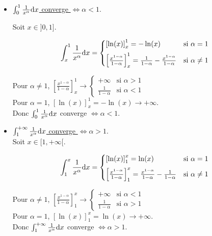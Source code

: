 \documentclass[]{article}
\begin{document}
\begin{itemize}
    \item \underline{$\int_{0}^{1} \frac{1}{x^{\alpha}} \text{d}x$ converge $\iff \alpha < 1$}.
    
    Soit $x \in ]0, 1]$. 

    \[ \int_{x}^{1} \frac{1}{x^{\alpha}} \text{d}x = \begin{cases}
        \left[ \ln(x) \right]_{x}^{1} = -\ln(x) & \text{si } \alpha = 1 \\[0.5em]
        \left[ \frac{x^{1-\alpha}}{1-\alpha} \right]_{x}^{1} = \frac{1}{1-\alpha} - \frac{x^{1-\alpha}}{1-\alpha} & \text{si } \alpha \neq 1
    \end{cases} \]

    Pour $\alpha \neq 1$, $\left[ \frac{x^{1-\alpha}}{1-\alpha} \right]_{x}^{1} \longrightarrow \begin{cases}
        +\infty & \text{si } \alpha > 1 \\[0.5em]
        \frac{1}{1-\alpha} & \text{si } \alpha < 1
    \end{cases}$ \\

    Pour $\alpha = 1$, $\left[ \ln(x) \right]_{x}^{1} = -\ln(x) \longrightarrow +\infty$. \\

    Donc $\int_{0}^{1} \frac{1}{x^{\alpha}} \text{d}x$ converge $\iff \alpha < 1$.

    \item \underline{$\int_{1}^{+\infty} \frac{1}{x^{\alpha}} \text{d}x$ converge $\iff \alpha > 1$}. \\
    
    Soit $x \in [1, +\infty[$.

    \[ \int_{1}^{x} \frac{1}{x^{\alpha}} \text{d}x = \begin{cases}
        \left[ \ln(x) \right]_{1}^{x} = \ln(x) & \text{si } \alpha = 1 \\[0.5em]
        \left[ \frac{x^{1-\alpha}}{1-\alpha} \right]_{1}^{x} = \frac{x^{1-\alpha}}{1-\alpha} - \frac{1}{1-\alpha} & \text{si } \alpha \neq 1
    \end{cases} \]

    Pour $\alpha \neq 1$, $\left[ \frac{x^{1-\alpha}}{1-\alpha} \right]_{1}^{x} \longrightarrow \begin{cases}
        +\infty & \text{si } \alpha < 1 \\[0.5em]
        \frac{1}{1-\alpha} & \text{si } \alpha > 1
    \end{cases}$ \\

    Pour $\alpha = 1$, $\left[ \ln(x) \right]_{1}^{x} = \ln(x) \longrightarrow +\infty$. \\

    Donc $\int_{1}^{+\infty} \frac{1}{x^{\alpha}} \text{d}x$ converge $\iff \alpha > 1$.

\end{itemize}
\end{document}
